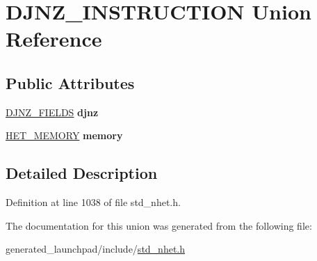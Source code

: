 \hypertarget{unionDJNZ__INSTRUCTION}{}\section{D\+J\+N\+Z\+\_\+\+I\+N\+S\+T\+R\+U\+C\+T\+I\+ON Union Reference}
\label{unionDJNZ__INSTRUCTION}
\subsection*{Public Attributes}
\begin{DoxyCompactItemize}
\item 
\mbox{\label{unionDJNZ__INSTRUCTION_acd92e88ab9c685f9a6223381b4340fda}} 
\mbox{\hyperlink{structdjnz__format}{D\+J\+N\+Z\+\_\+\+F\+I\+E\+L\+DS}} {\bfseries djnz}
\item 
\mbox{\label{unionDJNZ__INSTRUCTION_a50e09494b5b65f33db1e4b282ed319ea}} 
\mbox{\hyperlink{structmemory__format}{H\+E\+T\+\_\+\+M\+E\+M\+O\+RY}} {\bfseries memory}
\end{DoxyCompactItemize}


\subsection{Detailed Description}


Definition at line 1038 of file std\+\_\+nhet.\+h.



The documentation for this union was generated from the following file\+:\begin{DoxyCompactItemize}
\item 
generated\+\_\+launchpad/include/\mbox{\hyperlink{std__nhet_8h}{std\+\_\+nhet.\+h}}\end{DoxyCompactItemize}
